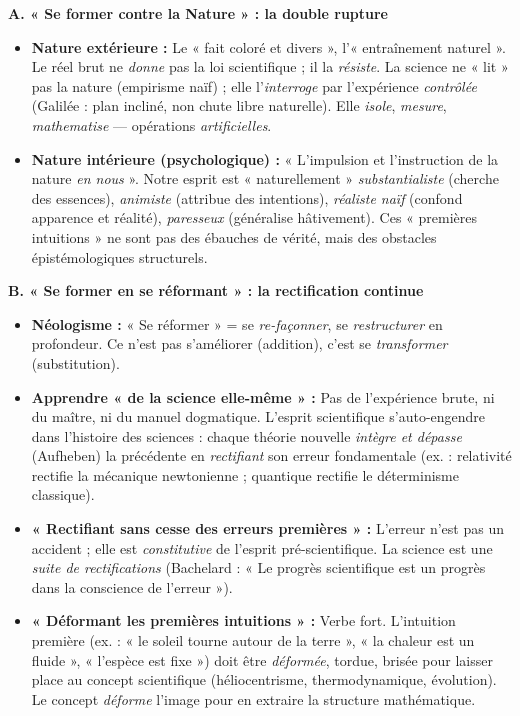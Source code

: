 \documentclass[11pt]{article}
\newcommand{\cle}[1]{{\popxbold\color{popdark}#1}}
\newcounter{popsec}
\newcounter{popsub}
\newcommand{\courssub}[1]{%
  \stepcounter{popsub}%
  \par\vspace{9pt}\noindent{\popxbold\fontsize{11.5}{13}\selectfont\color{popink}{\color{poporange}\thepopsec.\thepopsub}\hspace{6pt}#1}\par\nopagebreak\vspace{4pt}
}
\begin{document}
\begin{corrige}
\courssub{Analyse détaillée de l'argumentation}

\textbf{A. « Se former contre la Nature » : la double rupture}
\begin{itemize}
\item \textbf{Nature extérieure :} Le « fait coloré et divers », l'« entraînement naturel ». Le réel brut ne \emph{donne} pas la loi scientifique ; il la \emph{résiste}. La science ne « lit » pas la nature (empirisme naïf) ; elle l'\emph{interroge} par l'expérience \emph{contrôlée} (Galilée : plan incliné, non chute libre naturelle). Elle \emph{isole}, \emph{mesure}, \emph{mathematise} — opérations \emph{artificielles}.
\item \textbf{Nature intérieure (psychologique) :} « L'impulsion et l'instruction de la nature \emph{en nous} ». Notre esprit est « naturellement » \emph{substantialiste} (cherche des essences), \emph{animiste} (attribue des intentions), \emph{réaliste naïf} (confond apparence et réalité), \emph{paresseux} (généralise hâtivement). Ces « premières intuitions » ne sont pas des ébauches de vérité, mais des \cle{obstacles épistémologiques} structurels.
\end{itemize}

\textbf{B. « Se former en se réformant » : la rectification continue}
\begin{itemize}
\item \textbf{Néologisme :} « Se réformer » = se \emph{re-façonner}, se \emph{restructurer} en profondeur. Ce n'est pas s'améliorer (addition), c'est se \emph{transformer} (substitution).
\item \textbf{Apprendre « de la science elle-même » :} Pas de l'expérience brute, ni du maître, ni du manuel dogmatique. L'esprit scientifique s'auto-engendre dans l'\cle{histoire des sciences} : chaque théorie nouvelle \emph{intègre et dépasse} (Aufheben) la précédente en \emph{rectifiant} son erreur fondamentale (ex. : relativité rectifie la mécanique newtonienne ; quantique rectifie le déterminisme classique).
\item \textbf{« Rectifiant sans cesse des erreurs premières » :} L'erreur n'est pas un accident ; elle est \emph{constitutive} de l'esprit pré-scientifique. La science est une \emph{suite de rectifications} (Bachelard : « Le progrès scientifique est un progrès dans la conscience de l'erreur »).
\item \textbf{« Déformant les premières intuitions » :} Verbe fort. L'intuition première (ex. : « le soleil tourne autour de la terre », « la chaleur est un fluide », « l'espèce est fixe ») doit être \emph{déformée}, tordue, brisée pour laisser place au concept scientifique (héliocentrisme, thermodynamique, évolution). Le concept \emph{déforme} l'image pour en extraire la structure mathématique.
\end{itemize}


\end{corrige}
\end{document}
